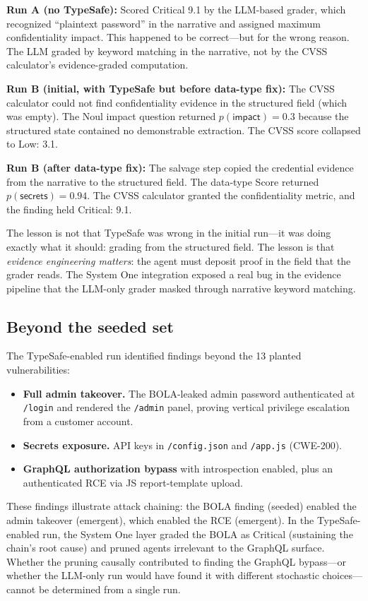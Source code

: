 \documentclass[conference]{IEEEtran}
\begin{document}
\textbf{Run A (no TypeSafe):} Scored Critical 9.1 by the LLM-based grader, which recognized ``plaintext password'' in the narrative and assigned maximum confidentiality impact. This happened to be correct---but for the wrong reason. The LLM graded by keyword matching in the narrative, not by the CVSS calculator's evidence-graded computation.

\textbf{Run B (initial, with TypeSafe but before data-type fix):} The CVSS calculator could not find confidentiality evidence in the structured field (which was empty). The Noul impact question returned $p(\textsf{impact}) = 0.3$ because the structured state contained no demonstrable extraction. The CVSS score collapsed to Low: 3.1.

\textbf{Run B (after data-type fix):} The salvage step copied the credential evidence from the narrative to the structured field. The data-type Score returned $p(\textsf{secrets}) = 0.94$. The CVSS calculator granted the confidentiality metric, and the finding held Critical: 9.1.

The lesson is not that TypeSafe was wrong in the initial run---it was doing exactly what it should: grading from the structured field. The lesson is that \emph{evidence engineering matters}: the agent must deposit proof in the field that the grader reads. The System One integration exposed a real bug in the evidence pipeline that the LLM-only grader masked through narrative keyword matching.

\subsection{Beyond the seeded set}

The TypeSafe-enabled run identified findings beyond the 13 planted vulnerabilities:

\begin{itemize}[leftmargin=*]
\item \textbf{Full admin takeover.} The BOLA-leaked admin password authenticated at \texttt{/login} and rendered the \texttt{/admin} panel, proving vertical privilege escalation from a customer account.
\item \textbf{Secrets exposure.} API keys in \texttt{/config.json} and \texttt{/app.js} (CWE-200).
\item \textbf{GraphQL authorization bypass} with introspection enabled, plus an authenticated RCE via JS report-template upload.
\end{itemize}

These findings illustrate attack chaining: the BOLA finding (seeded) enabled the admin takeover (emergent), which enabled the RCE (emergent). In the TypeSafe-enabled run, the System One layer graded the BOLA as Critical (sustaining the chain's root cause) and pruned agents irrelevant to the GraphQL surface. Whether the pruning causally contributed to finding the GraphQL bypass---or whether the LLM-only run would have found it with different stochastic choices---cannot be determined from a single run.
\end{document}
